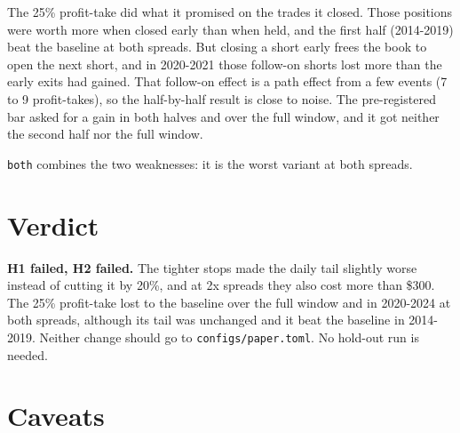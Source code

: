 \documentclass{article}
\begin{document}
The 25\% profit-take did what it promised on the trades it closed. Those positions were worth more when closed early than when held, and the first half (2014-2019) beat the baseline at both spreads. But closing a short early frees the book to open the next short, and in 2020-2021 those follow-on shorts lost more than the early exits had gained. That follow-on effect is a path effect from a few events (7 to 9 profit-takes), so the half-by-half result is close to noise. The pre-registered bar asked for a gain in both halves and over the full window, and it got neither the second half nor the full window.

\texttt{both} combines the two weaknesses: it is the worst variant at both spreads.

\section{Verdict}

\textbf{H1 failed, H2 failed.} The tighter stops made the daily tail slightly worse instead of cutting it by 20\%, and at 2x spreads they also cost more than \$300. The 25\% profit-take lost to the baseline over the full window and in 2020-2024 at both spreads, although its tail was unchanged and it beat the baseline in 2014-2019. Neither change should go to \texttt{configs/\allowbreak{}paper.\allowbreak{}toml}. No hold-out run is needed.

\section{Caveats}
\end{document}

